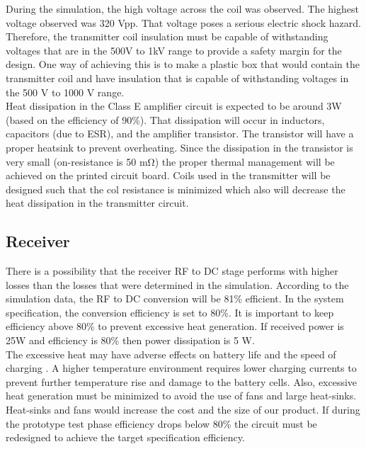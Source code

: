 \documentclass[12pt]{article}
\begin{document}
\indent
During the simulation, the high voltage across the coil was observed. The highest voltage observed was 320 Vpp. That voltage poses a serious electric shock hazard. Therefore, the transmitter coil insulation must be capable of withstanding voltages that are in the 500V to 1kV range to provide a safety margin for the design. One way of achieving this is to make a plastic box that would contain the transmitter coil and have insulation that is capable of withstanding voltages in the 500 V to 1000 V range.  \\

\indent
Heat dissipation in the Class E amplifier circuit is expected to be around 3W (based on the efficiency of 90\%). That dissipation will occur in inductors, capacitors (due to ESR), and the amplifier transistor. The transistor will have a proper heatsink to prevent overheating. Since the dissipation in the transistor is very small (on-resistance is 50 mΩ) the proper thermal management will be achieved on the printed circuit board. Coils used in the transmitter will be designed such that the col resistance is minimized which also will decrease the heat dissipation in the transmitter circuit.

\subsection{Receiver}

\indent \indent
There is a possibility that the receiver RF to DC stage performs with higher losses than the losses that were determined in the simulation. According to the simulation data, the RF to DC conversion will be 81\% efficient. In the system specification, the conversion efficiency is set to 80\%. It is important to keep efficiency above 80\% to prevent excessive heat generation. If received power is 25W and efficiency is  80\% then power dissipation is 5 W.   \\

\indent
The excessive heat may have adverse effects on battery life and the speed of charging \cite{TPSM265R1}. A higher temperature environment requires lower charging currents to prevent further temperature rise and damage to the battery cells. Also, excessive heat generation must be minimized to avoid the use of fans and large heat-sinks. Heat-sinks and fans would increase the cost and the size of our product.   If during the prototype test phase efficiency drops below 80\% the circuit must be redesigned to achieve the target specification efficiency. \\
\end{document}
